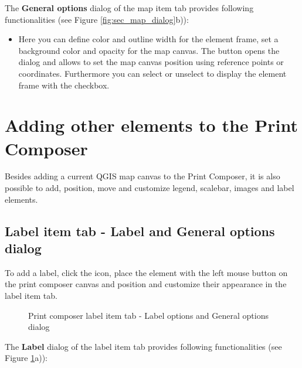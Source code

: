 
The \textbf{General options} dialog of the map item tab provides following
functionalities (see Figure \ref{fig:sec_map_dialog}b)):

\begin{itemize}[label=--]
\item Here you can define color and outline width for the element frame, set
a background color and opacity for the map canvas. The 
button opens the  dialog and allows to set the map
canvas position using reference points or coordinates. Furthermore you can
select or unselect to display the element frame with the  checkbox. 
\end{itemize}

\section{Adding other elements to the Print Composer} 

Besides adding a current QGIS map canvas to the Print Composer, it is also possible 
to add, position, move and customize legend, scalebar, images and label elements.

\subsection{Label item tab - Label and General options dialog}

To add a label, click the  icon, place
the element with the left mouse button on the print composer canvas and
position and customize their appearance in the label item tab. 

\begin{figure}[ht]
\centering
   \hspace{1cm}
   \caption{Print composer label item tab - Label options and General options dialog \nixcaption}\label{fig:label_option}
\end{figure}


The \textbf{Label} dialog of the label item tab provides following
functionalities (see Figure \ref{fig:label_option}a)):

